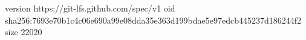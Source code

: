 version https://git-lfs.github.com/spec/v1
oid sha256:7693e70b1c4c06e690a99e08dda35e363d199bdae5e97edcb445237d186244f2
size 22020

